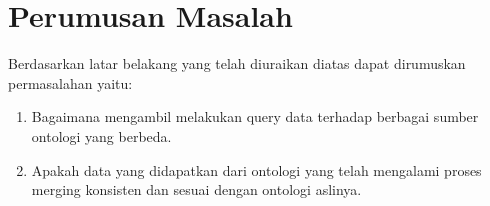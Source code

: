 \section{Perumusan Masalah}
Berdasarkan latar belakang yang telah diuraikan diatas dapat dirumuskan permasalahan yaitu: 
\begin{enumerate}
	\item Bagaimana mengambil melakukan query data terhadap berbagai sumber ontologi yang berbeda.
	\item Apakah data yang didapatkan dari ontologi yang telah mengalami proses merging konsisten dan sesuai dengan ontologi aslinya.
\end{enumerate}